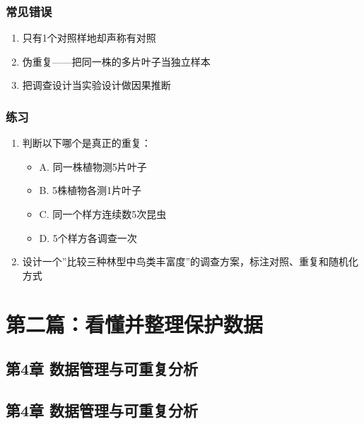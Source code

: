 \documentclass[
  letterpaper,
]{scrbook}
\providecommand{\tightlist}{%
  \setlength{\itemsep}{0pt}\setlength{\parskip}{0pt}}
\begin{document}
\section{常见错误}\label{ux5e38ux89c1ux9519ux8bef-1}

\begin{enumerate}
\def\labelenumi{\arabic{enumi}.}
\tightlist
\item
  只有1个对照样地却声称有对照
\item
  伪重复------把同一株的多片叶子当独立样本
\item
  把调查设计当实验设计做因果推断
\end{enumerate}

\section{练习}\label{ux7ec3ux4e60-2}

\begin{enumerate}
\def\labelenumi{\arabic{enumi}.}
\tightlist
\item
  判断以下哪个是真正的重复：

  \begin{itemize}
  \tightlist
  \item
    A. 同一株植物测5片叶子
  \item
    B. 5株植物各测1片叶子
  \item
    C. 同一个样方连续数5次昆虫\\
  \item
    D. 5个样方各调查一次
  \end{itemize}
\item
  设计一个''比较三种林型中鸟类丰富度''的调查方案，标注对照、重复和随机化方式
\end{enumerate}

\part{第二篇：看懂并整理保护数据}

\chapter{第4章
数据管理与可重复分析}\label{ux7b2c4ux7ae0-ux6570ux636eux7ba1ux7406ux4e0eux53efux91cdux590dux5206ux6790}

\chapter{第4章
数据管理与可重复分析}\label{ux7b2c4ux7ae0-ux6570ux636eux7ba1ux7406ux4e0eux53efux91cdux590dux5206ux6790-1}
\end{document}
